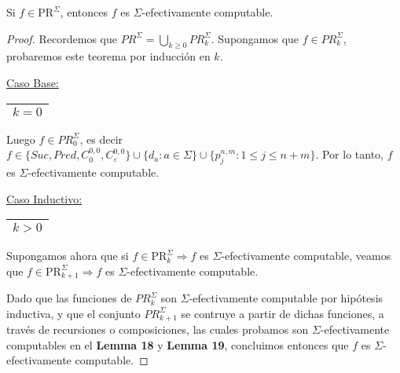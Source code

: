   \begin{theorem}
    \PN Si $f \in \mathrm{PR}^{\Sigma}$, entonces $f$ es $\Sigma$-efectivamente computable.
  \end{theorem}
  \begin{proof}
    \PN Recordemos que $PR^{\Sigma} = \bigcup\limits_{k \geq 0} PR_{k}^{\Sigma}$. Supongamos que $f \in
    PR_{k}^{\Sigma}$, probaremos este teorema por inducción en $k$.

    \vspace{3mm}
    \PN \underline{Caso Base:} \begin{tabular}{|c|} \hline $k = 0$ \\\hline \end{tabular}

    \PN Luego $f \in PR_{0}^{\Sigma}$, es decir $f \in \{Suc, Pred, C_{0}^{0,0}, C_{\varepsilon}^{0,0}\} \cup \{d_{a}:
    a \in \Sigma\} \cup \{p_{j}^{n,m} : 1 \leq j \leq n+m\}$. Por lo tanto, $f$ es $\Sigma$-efectivamente computable.

    \vspace{3mm}
		\PN \underline{Caso Inductivo:} \begin{tabular}{|c|} \hline $k > 0$ \\\hline \end{tabular}

    \PN Supongamos ahora que si $f \in \mathrm{PR}_{k}^{\Sigma} \Rightarrow f$ es
    $\Sigma$-efectivamente computable, veamos que $f \in \mathrm{PR}_{k+1}^{\Sigma} \Rightarrow f$ es
    $\Sigma$-efectivamente computable.

    \PN Dado que las funciones de $PR_{k}^{\Sigma}$ son $\Sigma$-efectivamente computable por hipótesis inductiva, y
    que el conjunto $PR_{k+1}^{\Sigma}$ se contruye a partir de dichas funciones, a través de recursiones o
    composiciones, las cuales probamos son $\Sigma$-efectivamente computables en el \textbf{Lemma 18} y
    \textbf{Lemma 19}, concluimos entonces que $f$ es $\Sigma$-efectivamente computable.
  \end{proof}


